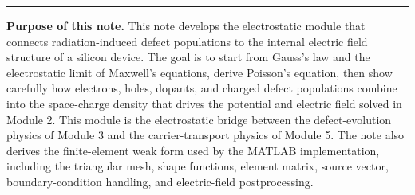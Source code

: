 \documentclass[11pt]{article}
\begin{document}

\hrule
\vspace{0.8em}

\begin{overviewbox}
\textbf{Purpose of this note.} This note develops the electrostatic module that connects radiation-induced defect populations to the internal electric field structure of a silicon device. The goal is to start from Gauss's law and the electrostatic limit of Maxwell's equations, derive Poisson's equation, then show carefully how electrons, holes, dopants, and charged defect populations combine into the space-charge density that drives the potential and electric field solved in Module 2. This module is the electrostatic bridge between the defect-evolution physics of Module 3 and the carrier-transport physics of Module 5. The note also derives the finite-element weak form used by the MATLAB implementation, including the triangular mesh, shape functions, element matrix, source vector, boundary-condition handling, and electric-field postprocessing.
\end{overviewbox}

\ProjectTOC


\SymbolsAcronymsSection
\end{document}
